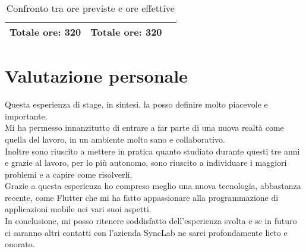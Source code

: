 \begin{center}
\begin{table}[h!]
\begin{tabularx}{\textwidth}{|c|c|X|}
			\hline
			\textbf{Totale ore: 320} & \textbf{Totale ore: 320} &  \\\hline	
		\end{tabularx}
		\vspace{0.3cm}
		\caption{Confronto tra ore previste e ore effettive}
	\end{table}
\end{center}


\section{Valutazione personale}
Questa esperienza di stage, in sintesi, la posso definire molto piacevole e importante.\\
Mi ha permesso innanzitutto di entrare a far parte di una nuova realtà come quella del lavoro, in un ambiente molto sano e collaborativo.\\
Inoltre sono riuscito a mettere in pratica quanto studiato durante questi tre anni e grazie al lavoro, per lo più autonomo, sono riuscito a individuare i maggiori problemi e a capire come risolverli.\\
Grazie a questa esperienza ho compreso meglio una nuova tecnologia, abbastanza recente, come Flutter che mi ha fatto appassionare alla programmazione di applicazioni mobile nei vari suoi aspetti.\\
In conclusione, mi posso ritenere soddisfatto dell'esperienza svolta e se in futuro ci saranno altri contatti con l'azienda SyncLab ne sarei profondamente lieto e onorato.


